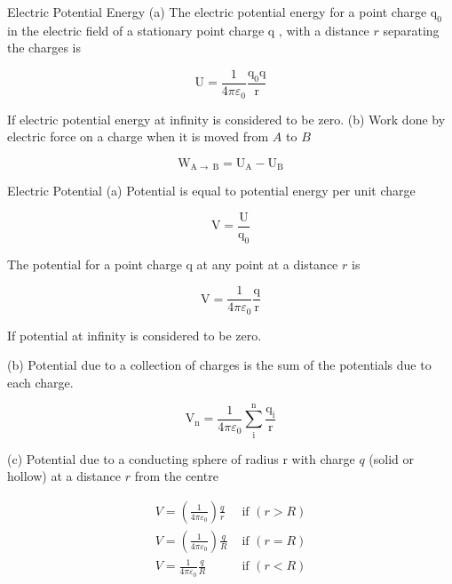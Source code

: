 




Electric Potential Energy
(a) The electric potential energy for a point charge $\mathrm{q}_0$ in the electric field of a stationary point charge q , with a distance $r$ separating the charges is

$$
\mathrm{U}=\frac{1}{4 \pi \varepsilon_0} \frac{\mathrm{q}_0 \mathrm{q}}{\mathrm{r}}
$$


If electric potential energy at infinity is considered to be zero.
(b) Work done by electric force on a charge when it is moved from $A$ to $B$

$$
\mathrm{W}_{\mathrm{A} \rightarrow \mathrm{~B}}=\mathrm{U}_{\mathrm{A}}-\mathrm{U}_{\mathrm{B}}
$$


Electric Potential
(a) Potential is equal to potential energy per unit charge

$$
\mathrm{V}=\frac{\mathrm{U}}{\mathrm{q}_0}
$$


The potential for a point charge q at any point at a distance $r$ is

$$
\mathrm{V}=\frac{1}{4 \pi \varepsilon_0} \frac{\mathrm{q}}{\mathrm{r}}
$$


If potential at infinity is considered to be zero.









(b) Potential due to a collection of charges is the sum of the potentials due to each charge.

$$
\mathrm{V}_{\mathrm{n}}=\frac{1}{4 \pi \varepsilon_0} \sum_{\mathrm{i}}^{\mathrm{n}} \frac{\mathrm{q}_{\mathrm{i}}}{\mathrm{r}}
$$

(c) Potential due to a conducting sphere of radius r with charge $q$ (solid or hollow) at a distance $r$ from the centre

$$
\begin{array}{ll}
V=\left(\frac{1}{4 \pi \varepsilon_0}\right) \frac{q}{r} & \text { if }(r>R) \\
V=\left(\frac{1}{4 \pi \varepsilon_0}\right) \frac{q}{R} & \text { if }(r=R) \\
V=\frac{1}{4 \pi \varepsilon_0} \frac{q}{R} & \text { if }(r<R)
\end{array}
$$








